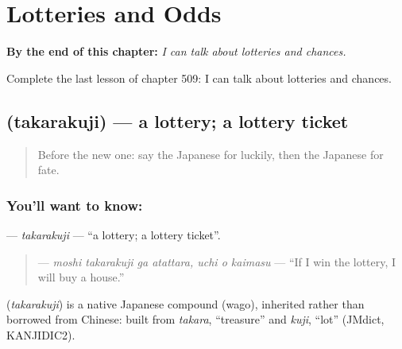 
\chapter{Lotteries and Odds}
\label{ch:ja-lotteries-and-odds}

\begin{chapteropening}
\textbf{By the end of this chapter:} \emph{I can talk about lotteries and chances.}

Complete the last lesson of chapter 509: I can talk about lotteries and chances.
\end{chapteropening}

\section[\texorpdfstring{\ja{たからくじ} (takarakuji)}{たからくじ (takarakuji)}]{ (takarakuji) — a lottery; a lottery ticket}

\label{lesson:JA-C509-takarakuji}



\begin{quote}
Before the new one: say the Japanese for luckily, then the Japanese for fate.
\end{quote}

\subsection*{You'll want to know: }
\textbf{} — \emph{takarakuji} — \textquotedblleft{}a lottery; a lottery ticket\textquotedblright{}.

\begin{quote}
\textbf{   } — \emph{moshi takarakuji ga atattara, uchi o kaimasu} — \textquotedblleft{}If I win the lottery, I will buy a house.\textquotedblright{}
\end{quote}

\begin{cousinweb}
\textbf{} (\emph{takarakuji}) is a native Japanese compound (wago), inherited rather than borrowed from Chinese: built from \emph{takara}, \textquotedblleft{}treasure\textquotedblright{} and \emph{kuji}, \textquotedblleft{}lot\textquotedblright{} (JMdict, KANJIDIC2).
\end{cousinweb}

